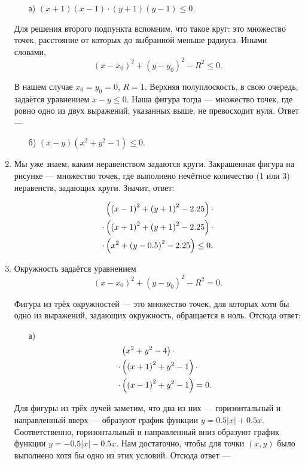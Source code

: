\begin{enumerate}
\begin{enumerate}
	\item[а)] $(x+1)(x-1) \cdot (y+1)(y-1) \le 0$.
\end{enumerate}

Для решения второго подпункта вспомним, что такое круг: это множество точек, расстояние от которых до выбранной меньше радиуса. Иными словами,
$$(x-x_0)^2+(y-y_0)^2 - R^2 \le 0.$$

В нашем случае $x_0 = y_0 = 0$, $R=1$. Верхняя полуплоскость, в свою очередь, задаётся уравнением $x-y \le 0$. Наша фигура тогда — множество точек, где ровно одно из двух выражений, указанных выше, не превосходит нуля. Ответ —

\begin{enumerate}
	\item[б)] $(x-y)(x^2 + y^2 -1) \le 0.$
\end{enumerate}

\item Мы уже знаем, каким неравенством задаются круги. Закрашенная фигура на рисунке — множество точек, где выполнено нечётное количество (1 или 3) неравенств, задающих круги. Значит, ответ:

\begin{align*}
	& \left( \left( x-1 \right) ^2 + \left( y+1 \right) ^2 - 2.25 \right) \cdot \\
	\cdot & \left( \left( x+1 \right) ^2 + \left( y+1 \right) ^2 - 2.25 \right) \cdot \\
	\cdot & \left( x^2 + \left( y-0.5 \right) ^2 - 2.25 \right) \le 0.
\end{align*}

\item Окружность задаётся уравнением
$$(x-x_0)^2+(y-y_0)^2 - R^2 = 0.$$

Фигура из трёх окружностей — это множество точек, для которых хотя бы одно из выражений, задающих окружность, обращается в ноль. Отсюда ответ:

\begin{enumerate}
	\item[а)]
	\begin{align*}
		& \left( x^2 + y^2 - 4 \right) \cdot \\
		\cdot & \left( \left( x+1 \right) ^2 + y^2 - 1 \right) \cdot \\
		\cdot & \left( \left( x-1 \right) ^2 + y^2 - 1 \right) = 0.
	\end{align*}
\end{enumerate}

\vspace{-0.4cm}
Для фигуры из трёх лучей заметим, что два из них — горизонтальный и направленный вверх — образуют график функции $y = 0.5 |x| + 0.5x$. Соответственно, горизонтальный и направленный вниз образуют график функции $y = -0.5 |x| - 0.5x$. Нам достаточно, чтобы для точки $(x,y)$ было выполнено хотя бы одно из этих условий. Отсюда ответ —


\end{enumerate}
